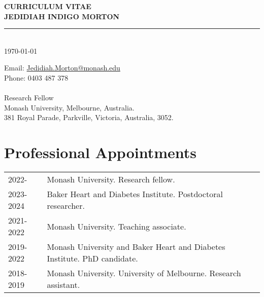 \documentclass[11pt]{article}
\newcommand{\thedate}{\today}
\begin{document}
\begin{titlepage}
    \begin{center}
        \Huge
        \textbf{CURRICULUM VITAE \\
JEDIDIAH INDIGO MORTON}
\rule{16cm}{2mm} \\
\Large
\thedate \\
       \vfill
    \end{center}
        \Large

\noindent
Email: \color{blue}
 \href{mailto:Jedidiah.Morton@Monash.edu}{Jedidiah.Morton@monash.edu} \\
\color{black}
Phone: \color{blue} 0403 487 378 \\
\color{black}
 \\
Research Fellow \\
Monash University, Melbourne, Australia. \\
381 Royal Parade, Parkville, Victoria, Australia, 3052. \\
\end{titlepage}

\tableofcontents



\color{white}
\cite{CostaEJCP2025,
RoddaPECA2025,
JensenVIH2025,
RoddaVIH2025,
MehtaJAD2025,
WangDC2025,
MortonEJPC2025,
MortonIJMI2025,
LivoriRSAP2025,
TamratJIGM2025,
MelJACI2024,
MortonPECA2024,
DMLDE2024,
DMMJA2024,
TanAJE2024,
DinaEJPC2024,
MortonVIH2024,
MehtaDRCP2024,
LivoriHLC2024,
FelekeDC2024,
ZiserBJCP2024,
ZiserJD2024,
AbebeNeur2024,
AbebeNeu2024,
DoodyAGG2024,
MacPE2024,
MortonDRCP2024,
TanCPT2024,
TanDRCP2024,
LivoriIJC2024,
LivoriEJPC2023,
MacCO2024,
FelekeDRCP2023,
LordPPT2023,
AbebeEHJ2023,
MortonPECA2023,
MortonAJKD2023,
DoodyAGG2023,
MacCirc2023,
DinaPE2023,
LloydDLOGIA2023,
MortonVIH2023,
TomicDRCP2023,
LazzDLOGIA2023,
QuigleyDRCP2022,
MacVIH2022,
MortonDLOGIA2023,
TomicDRCP2022,
TomicLDE2022,
MortonEJPC2023,
AdemiPE2022,
MortonDRCP2022,
MortonDM2022b,
MortonJECH2022,
OyunTAEM2022,
RuizDLOGIA2022,
MortonDC2022,
MortonJONS2022,
HastingsPE2022,
MortonDM2022a,
HardingNDT2022,
OyunSR2021,
MortonDC2021,
MortonDLOGIA2021,
MortonDC2020}
\color{black}
\pagebreak


\section*{Professional Appointments}

\begin{tabular}{p{2cm}p{14cm}}
2022- & Monash University. Research fellow. \\
2023-2024 & Baker Heart and Diabetes Institute. Postdoctoral researcher. \\
2021-2022 & Monash University. Teaching associate. \\
2019-2022 & Monash University and Baker Heart and Diabetes Institute. PhD candidate. \\
2018-2019 & Monash University. University of Melbourne. Research assistant. \\
\end{tabular}
\end{document}
